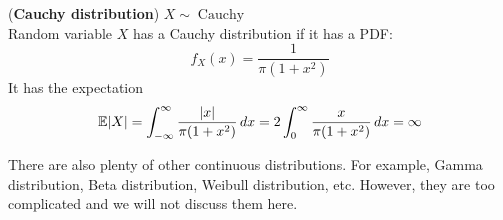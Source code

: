 \documentclass{huhtakm-template-book}
\newcommand{\expect}{\mathbb{E}}
\DeclareMathOperator{\Cauchy}{Cauchy}
\begin{document}
    \begin{eg}(\textbf{Cauchy distribution}) $X\sim\Cauchy$\\
        Random variable $X$ has a Cauchy distribution if it has a PDF:
        \begin{equation*}
            f_{X}(x)=\frac{1}{\pi(1+x^{2})}
        \end{equation*}
        It has the expectation
        \begin{equation*}
            \expect|X|=\intinfty\frac{|x|}{\pi(1+x^{2})}\,dx=2\intlu{0}{\infty}\frac{x}{\pi(1+x^{2})}\,dx=\infty
        \end{equation*}
    \end{eg}
    There are also plenty of other continuous distributions. For example, Gamma distribution, Beta distribution, Weibull distribution, etc. However, they are too complicated and we will not discuss them here.
\end{document}
